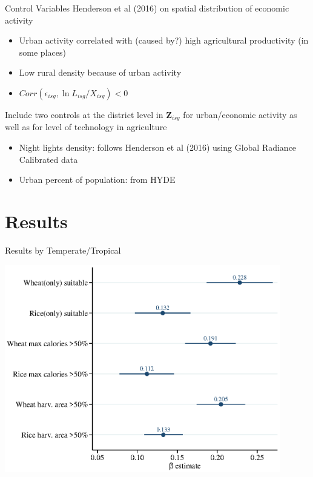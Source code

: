 \documentclass[10pt, xcolor=dvipsnames]{beamer}
\begin{document}
\begin{frame}{Control Variables}
Henderson et al (2016) on spatial distribution of economic activity
\begin{itemize}
  \item Urban activity correlated with (caused by?) high agricultural productivity (in some places)
  \item Low rural density because of urban activity
  \item $Corr(\epsilon_{isg},\ln L_{isg}/X_{isg})<0$
\end{itemize}

Include two controls at the district level in $\mathbf{Z}_{isg}$ for urban/economic activity as well as for level of technology in agriculture
\begin{itemize}
  \item Night lights density: follows Henderson et al (2016) using Global Radiance Calibrated data
  \item Urban percent of population: from HYDE
\end{itemize}

\end{frame}


\section{Results}

\begin{frame}{Results by Temperate/Tropical}\label{crop}
\begin{center}
\includegraphics[width=0.9\textwidth]{fig_coef_crop_base.eps}
\end{center}
\hfill \hyperlink{cropreg}{}
\end{frame}
\end{document}
